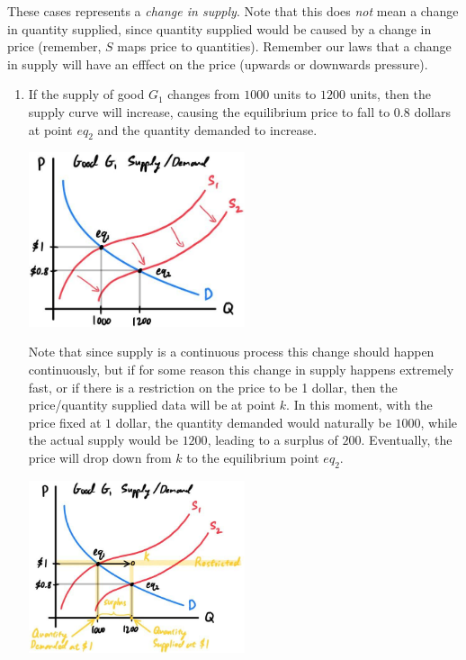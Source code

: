 \documentclass{article}
\begin{document}
    These cases represents a \textit{change in supply}. Note that this does \textit{not} mean a change in quantity supplied, since quantity supplied would be caused by a change in price (remember, $S$ maps price to quantities). Remember our laws that a change in supply will have an efffect on the price (upwards or downwards pressure).

    \begin{enumerate}
      \item If the supply of good $G_1$ changes from $1000$ units to $1200$ units, then the supply curve will increase, causing the equilibrium price to fall to $0.8$ dollars at point $eq_2$ and the quantity demanded to increase.
      \begin{center}
        \includegraphics[width=0.5\textwidth]{img/Supply_Inc.jpg}
      \end{center}
      Note that since supply is a continuous process this change should happen continuously, but if for some reason this change in supply happens extremely fast, or if there is a restriction on the price to be 1 dollar, then the price/quantity supplied data will be at point $k$. In this moment, with the price fixed at $1$ dollar, the quantity demanded would naturally be $1000$, while the actual supply would be $1200$, leading to a surplus of $200$. Eventually, the price will drop down from $k$ to the equilibrium point $eq_2$.
      \begin{center}
        \includegraphics[width=0.5\textwidth]{img/Supply_Inc_2.jpg}
      \end{center}


\end{enumerate}
\end{document}
